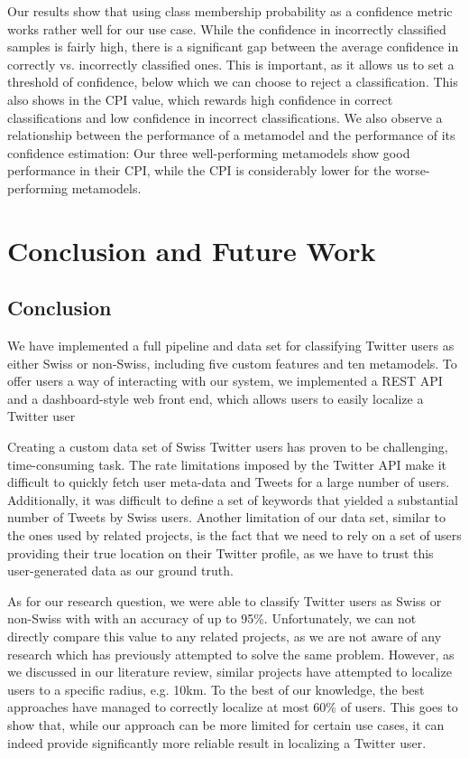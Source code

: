 \documentclass[10pt,a4paper]{article}
\begin{document}
Our results show that using class membership probability as a confidence metric works rather well for our use case. While the confidence in incorrectly classified samples is fairly high, there is a significant gap between the average confidence in correctly vs. incorrectly classified ones. This is important, as it allows us to set a threshold of confidence, below which we can choose to reject a classification. This also shows in the CPI value, which rewards high confidence in correct classifications and low confidence in incorrect classifications. We also observe a relationship between the performance of a metamodel and the performance of its confidence estimation: Our three well-performing metamodels show good performance in their CPI, while the CPI is considerably lower for the worse-performing metamodels.

\section{Conclusion and Future Work}
\subsection{Conclusion}
We have implemented a full pipeline and data set for classifying Twitter users as either Swiss or non-Swiss, including five custom features and ten metamodels. To offer users a way of interacting with our system, we implemented a REST API and a dashboard-style web front end, which allows users to easily localize a Twitter user

Creating a custom data set of Swiss Twitter users has proven to be challenging, time-consuming task. The rate limitations imposed by the Twitter API make it difficult to quickly fetch user meta-data and Tweets for a large number of users. Additionally, it was difficult to define a set of keywords that yielded a substantial number of Tweets by Swiss users. Another limitation of our data set, similar to the ones used by related projects, is the fact that we need to rely on a set of users providing their true location on their Twitter profile, as we have to trust this user-generated data as our ground truth.

As for our research question, we were able to classify Twitter users as Swiss or non-Swiss with with an accuracy of up to 95\%. Unfortunately, we can not directly compare this value to any related projects, as we are not aware of any research which has previously attempted to solve the same problem. However, as we discussed in our literature review, similar projects have attempted to localize users to a specific radius, e.g. 10km. To the best of our knowledge, the best approaches have managed to correctly localize at most 60\% of users. This goes to show that, while our approach can be more limited for certain use cases, it can indeed provide significantly more reliable result in localizing a Twitter user.
\end{document}
